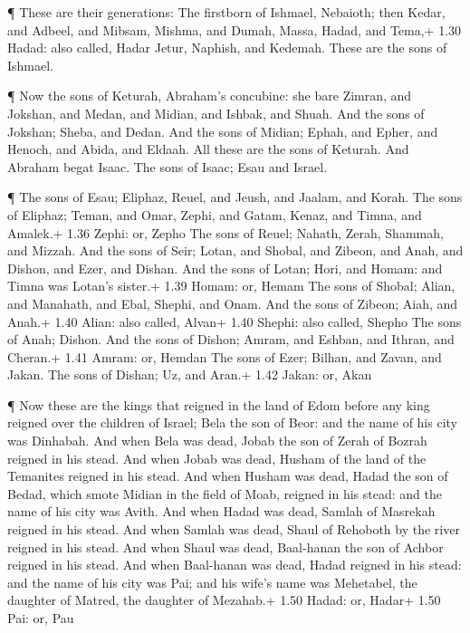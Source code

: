  ¶ These are their generations: The firstborn of Ishmael,
Nebaioth; then Kedar, and Adbeel, and Mibsam,  Mishma, and
Dumah, Massa, Hadad, and Tema,+ 1.30 Hadad: also called, Hadar
 Jetur, Naphish, and Kedemah. These are the sons of
Ishmael.

 ¶ Now the sons of Keturah, Abraham's concubine: she bare
Zimran, and Jokshan, and Medan, and Midian, and Ishbak, and Shuah. And
the sons of Jokshan; Sheba, and Dedan.  And the sons of
Midian; Ephah, and Epher, and Henoch, and Abida, and Eldaah. All these
are the sons of Keturah.  And Abraham begat Isaac. The sons
of Isaac; Esau and Israel.

 ¶ The sons of Esau; Eliphaz, Reuel, and Jeush, and Jaalam,
and Korah.  The sons of Eliphaz; Teman, and Omar, Zephi,
and Gatam, Kenaz, and Timna, and Amalek.+ 1.36 Zephi: or, Zepho
 The sons of Reuel; Nahath, Zerah, Shammah, and Mizzah.
 And the sons of Seir; Lotan, and Shobal, and Zibeon, and
Anah, and Dishon, and Ezer, and Dishan.  And the sons of
Lotan; Hori, and Homam: and Timna was Lotan's sister.+ 1.39 Homam: or,
Hemam  The sons of Shobal; Alian, and Manahath, and Ebal,
Shephi, and Onam. And the sons of Zibeon; Aiah, and Anah.+ 1.40 Alian:
also called, Alvan+ 1.40 Shephi: also called, Shepho  The
sons of Anah; Dishon. And the sons of Dishon; Amram, and Eshban, and
Ithran, and Cheran.+ 1.41 Amram: or, Hemdan  The sons of
Ezer; Bilhan, and Zavan, and Jakan. The sons of Dishan; Uz, and Aran.+
1.42 Jakan: or, Akan

 ¶ Now these are the kings that reigned in the land of Edom
before any king reigned over the children of Israel; Bela the son of
Beor: and the name of his city was Dinhabah.  And when Bela
was dead, Jobab the son of Zerah of Bozrah reigned in his stead.
 And when Jobab was dead, Husham of the land of the
Temanites reigned in his stead.  And when Husham was dead,
Hadad the son of Bedad, which smote Midian in the field of Moab, reigned
in his stead: and the name of his city was Avith.  And when
Hadad was dead, Samlah of Masrekah reigned in his stead. 
And when Samlah was dead, Shaul of Rehoboth by the river reigned in his
stead.  And when Shaul was dead, Baal-hanan the son of
Achbor reigned in his stead.  And when Baal-hanan was dead,
Hadad reigned in his stead: and the name of his city was Pai; and his
wife's name was Mehetabel, the daughter of Matred, the daughter of
Mezahab.+ 1.50 Hadad: or, Hadar+ 1.50 Pai: or, Pau

